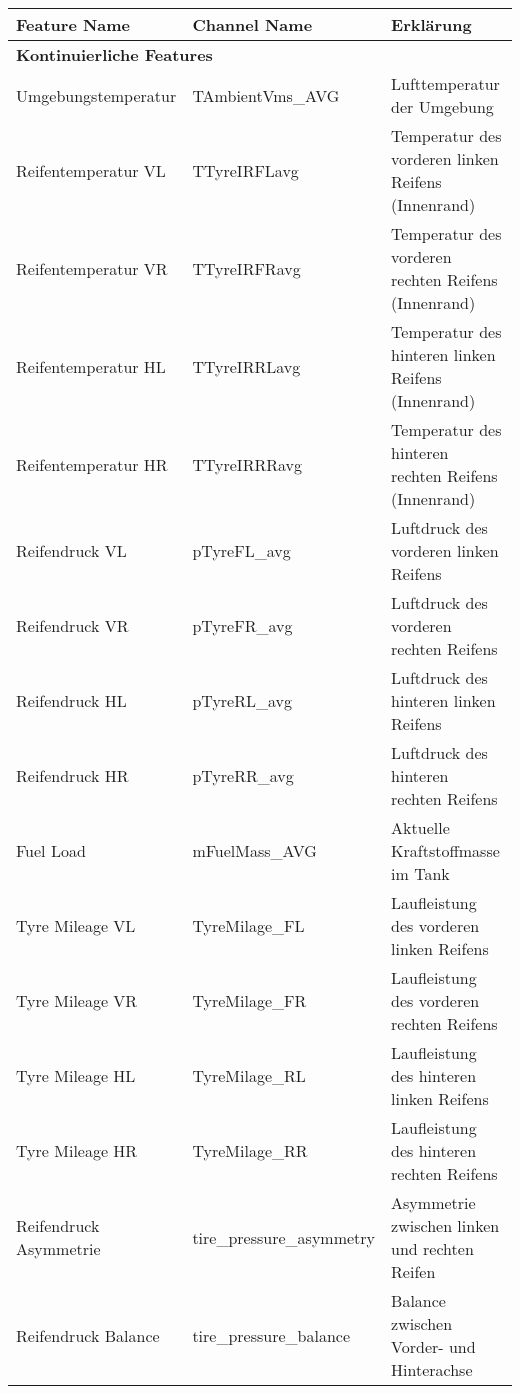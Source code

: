 \begin{table}[H]
  \centering
  \footnotesize
  \begin{tabular}{|p{4cm}|p{4.5cm}|p{6cm}|}
    \hline
    \textbf{Feature Name} & \textbf{Channel Name} & \textbf{Erklärung} \\
    \hline
    \multicolumn{3}{|l|}{\textbf{Kontinuierliche Features}} \\
    \hline
    Umgebungstemperatur & TAmbientVms\_AVG & Lufttemperatur der Umgebung \\
    \hline
    Reifentemperatur VL & TTyreIRFLavg & Temperatur des vorderen linken Reifens (Innenrand) \\
    \hline
    Reifentemperatur VR & TTyreIRFRavg & Temperatur des vorderen rechten Reifens (Innenrand) \\
    \hline
    Reifentemperatur HL & TTyreIRRLavg & Temperatur des hinteren linken Reifens (Innenrand) \\
    \hline
    Reifentemperatur HR & TTyreIRRRavg & Temperatur des hinteren rechten Reifens (Innenrand) \\
    \hline
    Reifendruck VL & pTyreFL\_avg & Luftdruck des vorderen linken Reifens \\
    \hline
    Reifendruck VR & pTyreFR\_avg & Luftdruck des vorderen rechten Reifens \\
    \hline
    Reifendruck HL & pTyreRL\_avg & Luftdruck des hinteren linken Reifens \\
    \hline
    Reifendruck HR & pTyreRR\_avg & Luftdruck des hinteren rechten Reifens \\
    \hline
    Fuel Load & mFuelMass\_AVG & Aktuelle Kraftstoffmasse im Tank \\
    \hline
    Tyre Mileage VL & TyreMilage\_FL & Laufleistung des vorderen linken Reifens \\
    \hline
    Tyre Mileage VR & TyreMilage\_FR & Laufleistung des vorderen rechten Reifens \\
    \hline
    Tyre Mileage HL & TyreMilage\_RL & Laufleistung des hinteren linken Reifens \\
    \hline
    Tyre Mileage HR & TyreMilage\_RR & Laufleistung des hinteren rechten Reifens \\
    \hline
    Reifendruck Asymmetrie & tire\_pressure\_asymmetry & Asymmetrie zwischen linken und rechten Reifen \\
    \hline
    Reifendruck Balance & tire\_pressure\_balance & Balance zwischen Vorder- und Hinterachse \\
    \hline

\end{tabular}
\end{table}
